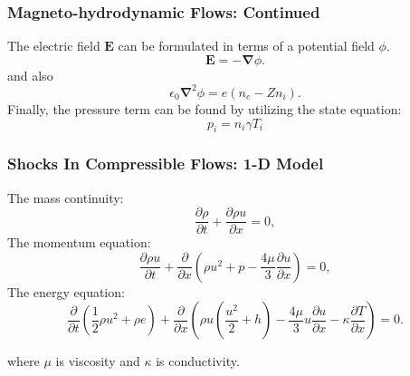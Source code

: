 \documentclass{fancyslides}
\begin{document}


\begin{frame}
 \frametitle{Magneto-hydrodynamic Flows: Continued}
 The electric field $\mathbf{E}$ can be formulated in terms of a potential field $\phi$.
\begin{equation}
	\mathbf{E}=-\mathbf{\nabla}\phi.
\end{equation}
and also 
\begin{equation}
	\epsilon_0 \mathbf{\nabla}^2 \phi=e(n_e-Zn_i).
\end{equation}
Finally, the pressure term can be found by utilizing the state equation:
\begin{equation}
p_i=n_i \gamma T_i
\end{equation}
\end{frame}



\begin{frame}
 \frametitle{Shocks In Compressible Flows: 1-D Model}
 The mass continuity:
\begin{equation}
\label{eq:220}
\frac{\partial \rho}{\partial t}+ \frac{\partial \rho u}{\partial x}=0,
\end{equation}
The momentum equation:
\begin{equation}
\label{eq:221}
\frac{\partial \rho u}{\partial t}+ \frac{\partial }{\partial x}\left ( \rho u^2 +p -\frac{4 \mu}{3}\frac{\partial u}{\partial x} \right )=0,
\end{equation}
The energy equation:
\begin{equation}
\label{eq:222}
\frac{\partial }{\partial t}\left ( \frac{1}{2}\rho u^2 + \rho e \right )+ \frac{\partial }{\partial x}\left ( \rho u(\frac{u^2}{2}+h)-\frac{4 \mu}{3}u\frac{\partial u}{\partial x}-\kappa \frac{\partial T}{\partial x} \right )=0.
\end{equation}

where $\mu$ is viscosity and $\kappa$ is conductivity.
\end{frame}
\end{document}
